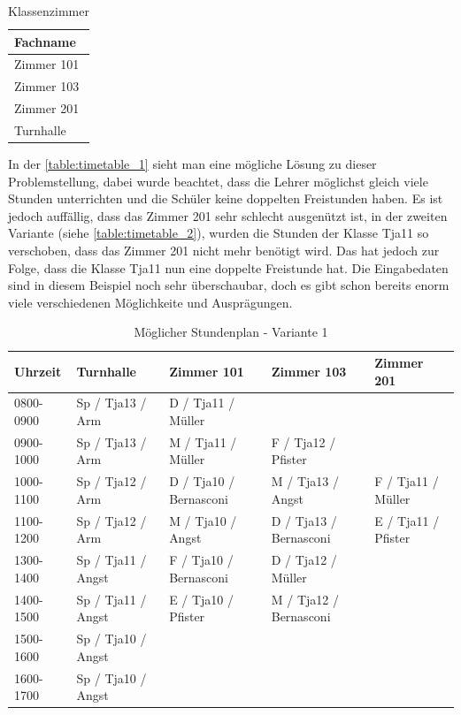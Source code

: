 \begin{table}[ht]
\centering
  \begin{tabular}{ l }
	\hline
	\rowcolor{gray}
	\textbf{Fachname}\\ \hline
	Zimmer 101\\ \hline
	Zimmer 103\\ \hline
	Zimmer 201\\ \hline
	Turnhalle
  \end{tabular}
   \caption{Klassenzimmer}\label{table:eg_schoolroom}
\end{table}

\FloatBarrier
In der \autoref{table:timetable_1} sieht man eine mögliche Lösung zu dieser Problemstellung, dabei wurde beachtet, dass die Lehrer möglichst gleich viele Stunden unterrichten und die Schüler keine doppelten Freistunden haben. Es ist jedoch auffällig, dass das Zimmer 201 sehr schlecht ausgenützt ist, in der zweiten Variante (siehe \autoref{table:timetable_2}), wurden die Stunden der Klasse Tja11 so verschoben, dass das Zimmer 201 nicht mehr benötigt wird. Das hat jedoch zur Folge, dass die Klasse Tja11 nun eine doppelte Freistunde hat. Die Eingabedaten sind in diesem Beispiel noch sehr überschaubar, doch es gibt schon bereits enorm viele verschiedenen Möglichkeite und Ausprägungen.

\begin{table}[ht]
\centering
  \begin{tabular}{ l | l | l | l | l }
	\hline
	\rowcolor{gray}
	\textbf{Uhrzeit} 	& \textbf{Turnhalle}	& \textbf{Zimmer 101} 	& \textbf{Zimmer 103}	&  \textbf{Zimmer 201}\\ \hline
	0800-0900		& Sp / Tja13 / Arm		& D / Tja11 / Müller		& 				& \\ \hline
	0900-1000		& Sp / Tja13 / Arm		& M / Tja11 / Müller		& F / Tja12 / Pfister		& \\ \hline
	1000-1100		& Sp / Tja12 / Arm		& D / Tja10 / Bernasconi	& M / Tja13 / Angst		& F / Tja11 / Müller\\ \hline
	1100-1200		& Sp / Tja12 / Arm		& M / Tja10 / Angst		& D / Tja13 / Bernasconi	& E / Tja11 / Pfister\\ \hline \hline
	1300-1400		& Sp / Tja11 / Angst	& F / Tja10 / Bernasconi	& D / Tja12 / Müller		& \\ \hline
	1400-1500		& Sp / Tja11 / Angst	& E / Tja10 / Pfister		& M / Tja12 / Bernasconi	& \\ \hline
	1500-1600		& Sp / Tja10 / Angst	& 				& 				& \\ \hline
	1600-1700		& Sp / Tja10 / Angst	& 				& 				& \\ \hline
  \end{tabular}
   \caption{Möglicher Stundenplan - Variante 1}\label{table:timetable_1}
\end{table}

